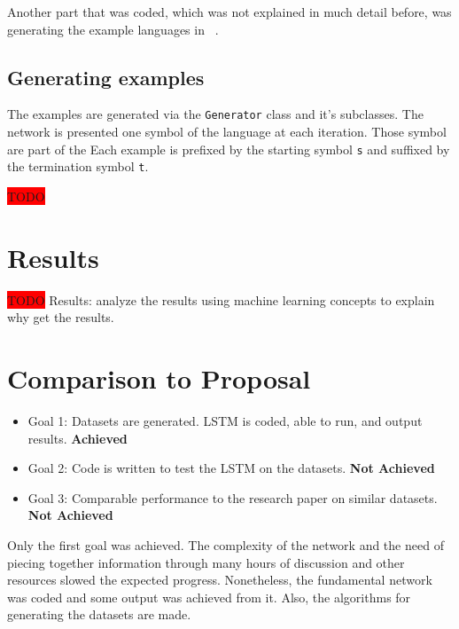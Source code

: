 \documentclass[11pt,letterpaper]{article}
\begin{document}
Another part that was coded, which was not explained in much detail before, was generating the example languages in ~\cite{Gers:01}.

\subsection{Generating examples}
The examples are generated via the \verb!Generator! class and it's subclasses. The network is presented one symbol of the language at each iteration. Those symbol are part of the  Each example is prefixed by the starting symbol \verb!s! and suffixed by the termination symbol \verb!t!. 
 

\colorbox{red}{TODO}

\section{Results}
\colorbox{red}{TODO}
Results: analyze the results using machine learning concepts to explain why get the results.

\section{Comparison to Proposal}
\begin{itemize}
	\item Goal 1: Datasets are generated. LSTM is coded, able to run, and output results. \textbf{Achieved}
	\item Goal 2: Code is written to test the LSTM on the datasets. \textbf{Not Achieved}
	\item Goal 3: Comparable performance to the research paper on similar datasets. \textbf{Not Achieved}
\end{itemize}

Only the first goal was achieved. The complexity of the network and the need of piecing together information through many hours of discussion and other resources slowed the expected progress. Nonetheless, the fundamental network was coded and some output was achieved from it. Also, the algorithms for generating the datasets are made. 
\end{document}
